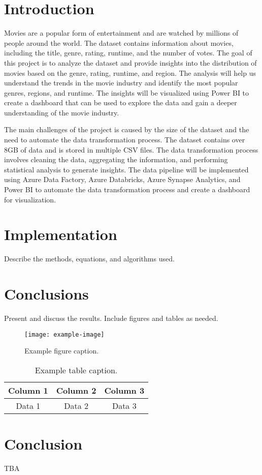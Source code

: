 \documentclass[a4paper,12pt]{article}
\begin{document}
\section{Introduction}
\label{sec:introduction}

Movies are a popular form of entertainment and are watched by millions of people around the world. The dataset contains information about movies, including the title, genre, rating, runtime, and the number of votes. The goal of this project is to analyze the dataset and provide insights into the distribution of movies based on the genre, rating, runtime, and region. The analysis will help us understand the trends in the movie industry and identify the most popular genres, regions, and runtime. The insights will be visualized using Power BI to create a dashboard that can be used to explore the data and gain a deeper understanding of the movie industry.

The main challenges of the project is caused by the size of the dataset and the need to automate the data transformation process. The dataset contains over 8GB of data and is stored in multiple CSV files. The data transformation process involves cleaning the data, aggregating the information, and performing statistical analysis to generate insights. The data pipeline will be implemented using Azure Data Factory, Azure Databricks, Azure Synapse Analytics, and Power BI to automate the data transformation process and create a dashboard for visualization.

\section{Implementation}
\label{sec:implementation}

Describe the methods, equations, and algorithms used.

\section{Conclusions}
\label{sec:conclusions}

Present and discuss the results. Include figures and tables as needed.

\begin{figure}[H]
    \centering
    \texttt{[image: example-image]}
    \caption{Example figure caption.}
    \label{fig:example}
\end{figure}

\begin{table}[H]
    \centering
    \begin{tabular}{|c|c|c|}
        \hline
        Column 1 & Column 2 & Column 3 \\
        \hline
        Data 1 & Data 2 & Data 3 \\
        \hline
    \end{tabular}
    \caption{Example table caption.}
    \label{tab:example}
\end{table}

\section{Conclusion}
\label{sec:conclusion}

TBA

\cite{article}
\end{document}
